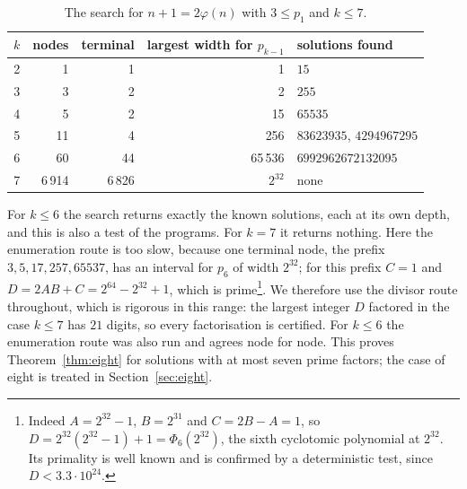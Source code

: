 \documentclass[11pt,reqno]{amsart}
\numberwithin{equation}{section}
\theoremstyle{plain}
\theoremstyle{definition}
\theoremstyle{remark}
\begin{document}
\begin{table}[ht]
\centering
\caption{The search for $n+1=2\varphi(n)$ with $3\le p_1$ and $k\le7$.}
\label{tab:seven}
\smallskip
\begin{tabular}{@{}rrrrl@{}}
\toprule
$k$ & nodes & terminal & largest width for $p_{k-1}$ & solutions found \\
\midrule
2 &     1 &     1 &                 1 & $15$ \\
3 &     3 &     2 &                 2 & $255$ \\
4 &     5 &     2 &                15 & $65535$ \\
5 &    11 &     4 &               256 & $83623935$, $4294967295$ \\
6 &    60 &    44 &            65\,536 & $6992962672132095$ \\
7 & 6\,914 & 6\,826 &          $2^{32}$ & none \\
\bottomrule
\end{tabular}
\end{table}

For $k\le6$ the search returns exactly the known solutions, each at
its own depth, and this is also a test of the programs. For $k=7$ it
returns nothing. Here the enumeration route is too slow, because one
terminal node, the prefix $3,5,17,257,65537$, has an interval for
$p_6$ of width $2^{32}$; for this prefix $C=1$ and
$D=2AB+C=2^{64}-2^{32}+1$, which is prime\footnote{Indeed
$A=2^{32}-1$, $B=2^{31}$ and $C=2B-A=1$, so
$D=2^{32}(2^{32}-1)+1=\Phi_6(2^{32})$, the sixth cyclotomic polynomial
at $2^{32}$. Its primality is well known and is confirmed by a
deterministic test, since $D<3.3\cdot10^{24}$.}. We
therefore use the divisor route throughout, which is rigorous in this
range: the largest integer $D$ factored in the case $k\le7$ has $21$
digits, so every factorisation is certified. For $k\le6$ the
enumeration route was also run and agrees node for node. This proves
Theorem~\ref{thm:eight} for solutions with at most seven prime
factors; the case of eight is treated in Section~\ref{sec:eight}.
\end{document}
